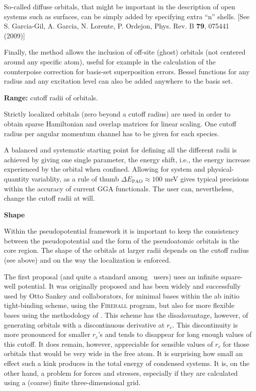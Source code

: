 So-called diffuse orbitals, that might be important in the description
of open systems such as surfaces, can be simply added by specifying
extra ``n'' shells. [See S. Garcia-Gil, A. Garcia, N. Lorente,
  P. Ordejon, Phys. Rev. B \textbf{79}, 075441 (2009)]

Finally, the method allows the inclusion of off-site (ghost) orbitals
(not centered around any specific atom), useful for example in the
calculation of the counterpoise correction for basis-set superposition
errors.  Bessel functions for any radius and any excitation level can
also be added anywhere to the basis set.

\textbf{Range:} cutoff radii of orbitals.

Strictly localized orbitals (zero beyond a cutoff radius) are used in
order to obtain sparse Hamiltonian and overlap matrices for linear
scaling. One cutoff radius per angular momentum channel has to be
given for each species.

A balanced and systematic starting point for defining all the
different radii is achieved by giving one single parameter, the energy
shift, i.e., the energy increase experienced by the orbital when confined.
Allowing for system and physical-quantity variablity, as a rule of
thumb $\Delta E_{\mathrm{PAO}} \approx 100$ meV gives typical
precisions within the accuracy of current GGA functionals.  The user
can, nevertheless, change the cutoff radii at will.

\textbf{Shape}

Within the pseudopotential framework it is important to keep the
consistency between the pseudopotential and the form of the
pseudoatomic orbitals in the core region.  The shape of the orbitals
at larger radii depends on the cutoff radius (see above) and on the
way the localization is enforced.

The first proposal (and quite a standard among \siesta\ users)
uses an infinite square-well potential.  It was originally proposed
and has been widely and successfully used by Otto Sankey and
collaborators, for minimal bases within the ab initio tight-binding
scheme, using the \textsc{Fireball } program, but also for more flexible
bases using the methodology of \siesta.  This scheme has the
disadavantage, however, of generating orbitals with a discontinuous
derivative at $r_c$.  This discontinuity is more pronounced for
smaller $r_c$'s and tends to disappear for long enough values of this
cutoff.  It does remain, however, appreciable for sensible values of
$r_c$ for those orbitals that would be very wide in the free atom.  It
is surprising how small an effect such a kink produces in the total
energy of condensed systems.  It is, on the other hand, a problem for
forces and stresses, especially if they are calculated using a
(coarse) finite three-dimensional grid.

